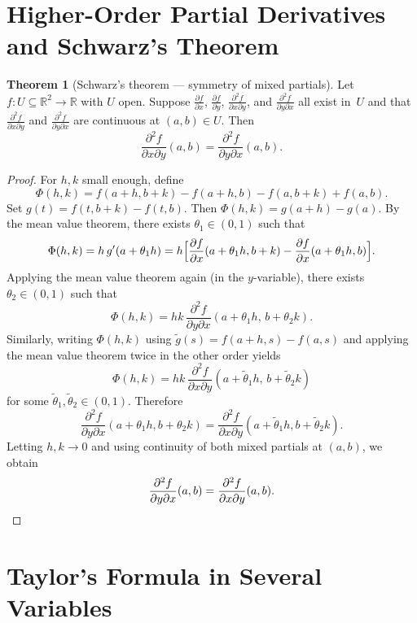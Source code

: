 \documentclass[12pt,a4paper]{book}
\theoremstyle{definition}
\newtheorem{theorem}{Theorem}[chapter]
\begin{document}
\section{Higher-Order Partial Derivatives and Schwarz's Theorem}
\label{sec:schwarz}

\begin{theorem}[Schwarz's theorem --- symmetry of mixed partials]
\label{thm:schwarz}
Let $f\colon U\subseteq\mathbb{R}^2\to\mathbb{R}$ with $U$ open.  Suppose
$\frac{\partial f}{\partial x}$, $\frac{\partial f}{\partial y}$,
$\frac{\partial^2 f}{\partial x\partial y}$, and
$\frac{\partial^2 f}{\partial y\partial x}$ all exist in~$U$ and that
$\frac{\partial^2 f}{\partial x\partial y}$ and
$\frac{\partial^2 f}{\partial y\partial x}$ are continuous at
$(a,b)\in U$.  Then
\[
  \frac{\partial^2 f}{\partial x\partial y}(a,b)
  = \frac{\partial^2 f}{\partial y\partial x}(a,b).
\]
\end{theorem}

\begin{proof}
For $h,k$ small enough, define
\[
  \Phi(h,k)
  = f(a+h,b+k)-f(a+h,b)-f(a,b+k)+f(a,b).
\]
Set $g(t)=f(t,b+k)-f(t,b)$.  Then $\Phi(h,k)=g(a+h)-g(a)$.  By the mean
value theorem, there exists $\theta_1\in(0,1)$ such that
\[
  \Phi(h,k)=h\,g'(a+\theta_1 h)
  = h\Bigl[\frac{\partial f}{\partial x}(a+\theta_1 h,b+k)
    -\frac{\partial f}{\partial x}(a+\theta_1 h,b)\Bigr].
\]
Applying the mean value theorem again (in the $y$-variable), there exists
$\theta_2\in(0,1)$ such that
\[
  \Phi(h,k) = hk\,\frac{\partial^2 f}{\partial y\partial x}
  (a+\theta_1 h,\, b+\theta_2 k).
\]
Similarly, writing $\Phi(h,k)$ using $\tilde{g}(s)=f(a+h,s)-f(a,s)$ and
applying the mean value theorem twice in the other order yields
\[
  \Phi(h,k)=hk\,\frac{\partial^2 f}{\partial x\partial y}
  (a+\tilde\theta_1 h,\, b+\tilde\theta_2 k)
\]
for some $\tilde\theta_1,\tilde\theta_2\in(0,1)$.  Therefore
\[
  \frac{\partial^2 f}{\partial y\partial x}(a+\theta_1 h,b+\theta_2 k)
  = \frac{\partial^2 f}{\partial x\partial y}
    (a+\tilde\theta_1 h, b+\tilde\theta_2 k).
\]
Letting $h,k\to 0$ and using continuity of both mixed partials at $(a,b)$,
we obtain
\[
  \frac{\partial^2 f}{\partial y\partial x}(a,b)
  = \frac{\partial^2 f}{\partial x\partial y}(a,b).  \qedhere
\]
\end{proof}

\section{Taylor's Formula in Several Variables}
\label{sec:taylor-multi}
\end{document}
